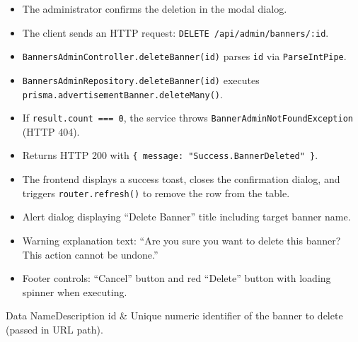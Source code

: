 \begin{itemize}[leftmargin=1.6em,topsep=3pt,itemsep=2pt,parsep=0pt,label=$\bullet$]
    \item The administrator confirms the deletion in the modal dialog.
    \item The client sends an HTTP request: \texttt{DELETE /api/admin/banners/:id}.
    \item \texttt{Banners\allowbreak{}Admin\allowbreak{}Controller.\allowbreak{}deleteBanner(\allowbreak{}id)} parses \texttt{id} via \texttt{ParseIntPipe}.
    \item \texttt{Banners\allowbreak{}Admin\allowbreak{}Repository.\allowbreak{}deleteBanner(\allowbreak{}id)} executes \texttt{prisma.\allowbreak{}advertisement\allowbreak{}Banner.\allowbreak{}deleteMany()}.
    \item If \texttt{result.\allowbreak{}count =\allowbreak{}=\allowbreak{}= 0}, the service throws \texttt{Banner\allowbreak{}Admin\allowbreak{}Not\allowbreak{}Found\allowbreak{}Exception} (HTTP 404).
    \item Returns HTTP 200 with \texttt{\{ message: "Success.\allowbreak{}BannerDeleted" \}}.
    \item The frontend displays a success toast, closes the confirmation dialog, and triggers \texttt{router.refresh()} to remove the row from the table.
\end{itemize}

\begin{itemize}[leftmargin=1.6em,topsep=3pt,itemsep=2pt,parsep=0pt,label=$\bullet$]
    \item Alert dialog displaying ``Delete Banner'' title including target banner name.
    \item Warning explanation text: ``Are you sure you want to delete this banner? This action cannot be undone.''
    \item Footer controls: ``Cancel'' button and red ``Delete'' button with loading spinner when executing.
\end{itemize}


\begin{specdatatable}{Data Name}{Description}
id & Unique numeric identifier of the banner to delete (passed in URL path).\\ \hline
\end{specdatatable}

